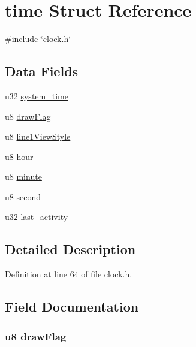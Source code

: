 \hypertarget{structtime}{\section{time \-Struct \-Reference}
\label{structtime}
}


{\ttfamily \#include \char`\"{}clock.\-h\char`\"{}}

\subsection*{\-Data \-Fields}
\begin{DoxyCompactItemize}
\item 
u32 \hyperlink{structtime_a6a2672b74bddd00613c7fc2b4cd92b3b}{system\-\_\-time}
\item 
u8 \hyperlink{structtime_a3e8544bc695992c4f9df78288018341b}{draw\-Flag}
\item 
u8 \hyperlink{structtime_ae1915be5ea33290542c98fcc2ec95f8c}{line1\-View\-Style}
\item 
u8 \hyperlink{structtime_aee425ac71759c167362d22f272d89804}{hour}
\item 
u8 \hyperlink{structtime_ae0a353dafc35c2935794f93a4e473a19}{minute}
\item 
u8 \hyperlink{structtime_abaa2f1dd9c0722c3f314a8d3505fe630}{second}
\item 
u32 \hyperlink{structtime_a2c7b985e90dbecdd0324cf732375d4ed}{last\-\_\-activity}
\end{DoxyCompactItemize}


\subsection{\-Detailed \-Description}


\-Definition at line 64 of file clock.\-h.



\subsection{\-Field \-Documentation}
\hypertarget{structtime_a3e8544bc695992c4f9df78288018341b}{
\subsubsection[{draw\-Flag}]{\setlength{\rightskip}{0pt plus 5cm}u8 {\bf draw\-Flag}}}\label{structtime_a3e8544bc695992c4f9df78288018341b}


